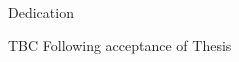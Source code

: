 
\renewcommand{\baselinestretch}{2}
\small\normalsize
\hbox{\ }
 
\vspace{.5in}

\begin{center}
\large{Dedication}
\end{center} 

TBC Following acceptance of Thesis
